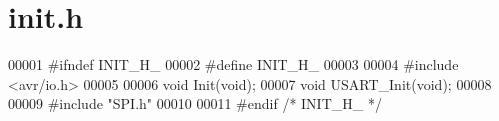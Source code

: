 \hypertarget{init_8h_source}{}\section{init.\+h}
\label{init_8h_source}

\begin{DoxyCode}
00001 \textcolor{preprocessor}{#ifndef INIT\_H\_}
00002 \textcolor{preprocessor}{#define INIT\_H\_}
00003 
00004 \textcolor{preprocessor}{#include <avr/io.h>}
00005 
00006 \textcolor{keywordtype}{void} Init(\textcolor{keywordtype}{void});
00007 \textcolor{keywordtype}{void} USART\_Init(\textcolor{keywordtype}{void});
00008 
00009 \textcolor{preprocessor}{#include "SPI.h"}
00010 
00011 \textcolor{preprocessor}{#endif }\textcolor{comment}{/* INIT\_H\_ */}\textcolor{preprocessor}{}
\end{DoxyCode}
